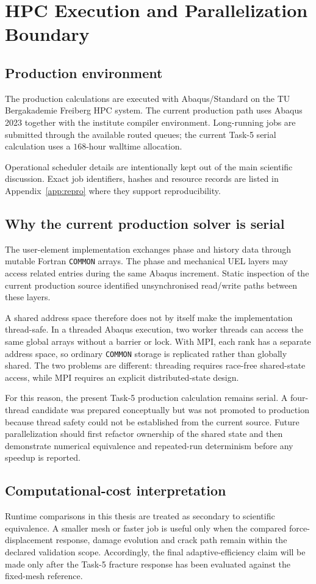 \chapter{HPC Execution and Parallelization Boundary}
\label{ch:hpc}

\section{Production environment}
The production calculations are executed with Abaqus/Standard on the TU Bergakademie Freiberg HPC system. The current production path uses Abaqus 2023 together with the institute compiler environment. Long-running jobs are submitted through the available routed queues; the current Task-5 serial calculation uses a $168$-hour walltime allocation.

Operational scheduler details are intentionally kept out of the main scientific discussion. Exact job identifiers, hashes and resource records are listed in Appendix~\ref{app:repro} where they support reproducibility.

\section{Why the current production solver is serial}
The user-element implementation exchanges phase and history data through mutable Fortran \texttt{COMMON} arrays. The phase and mechanical UEL layers may access related entries during the same Abaqus increment. Static inspection of the current production source identified unsynchronised read/write paths between these layers.

A shared address space therefore does not by itself make the implementation thread-safe. In a threaded Abaqus execution, two worker threads can access the same global arrays without a barrier or lock. With MPI, each rank has a separate address space, so ordinary \texttt{COMMON} storage is replicated rather than globally shared. The two problems are different: threading requires race-free shared-state access, while MPI requires an explicit distributed-state design.

For this reason, the present Task-5 production calculation remains serial. A four-thread candidate was prepared conceptually but was not promoted to production because thread safety could not be established from the current source. Future parallelization should first refactor ownership of the shared state and then demonstrate numerical equivalence and repeated-run determinism before any speedup is reported.

\section{Computational-cost interpretation}
Runtime comparisons in this thesis are treated as secondary to scientific equivalence. A smaller mesh or faster job is useful only when the compared force-displacement response, damage evolution and crack path remain within the declared validation scope. Accordingly, the final adaptive-efficiency claim will be made only after the Task-5 fracture response has been evaluated against the fixed-mesh reference.
